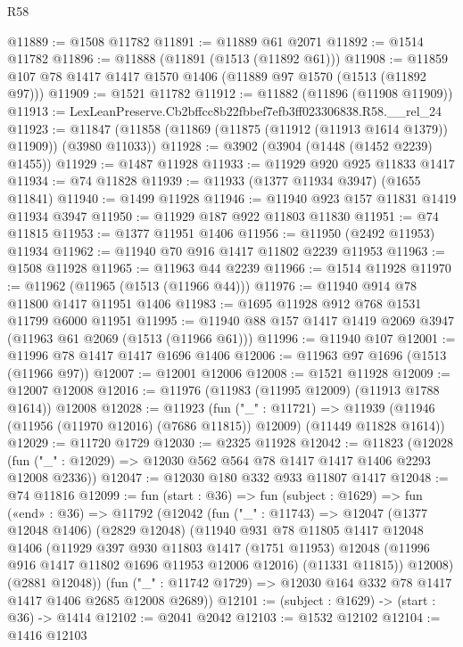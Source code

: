 \begin{lexlean}{R58}
\begin{coremodule}
{{@11889 := @1508 @11782
@11891 := @11889 @61 @2071
@11892 := @1514 @11782
@11896 := @11888 (@11891 (@1513 (@11892 @61)))
@11908 := @11859 @107 @78 @1417 @1417 @1570 @1406 (@11889 @97 @1570 (@1513 (@11892 @97)))
@11909 := @1521 @11782
@11912 := @11882 (@11896 (@11908 @11909))
@11913 := LexLeanPreserve.Cb2bffcc8b22fbbef7efb3ff023306838.R58.__rel_24
@11923 := @11847 (@11858 (@11869 (@11875 (@11912 (@11913 @1614 @1379)) @11909)) (@3980 @11033))
@11928 := @3902 (@3904 (@1448 (@1452 @2239) @1455))
@11929 := @1487 @11928
@11933 := @11929 @920 @925 @11833 @1417
@11934 := @74 @11828
@11939 := @11933 (@1377 @11934 @3947) (@1655 @11841)
@11940 := @1499 @11928
@11946 := @11940 @923 @157 @11831 @1419 @11934 @3947
@11950 := @11929 @187 @922 @11803 @11830
@11951 := @74 @11815
@11953 := @1377 @11951 @1406
@11956 := @11950 (@2492 @11953) @11934
@11962 := @11940 @70 @916 @1417 @11802 @2239 @11953
@11963 := @1508 @11928
@11965 := @11963 @44 @2239
@11966 := @1514 @11928
@11970 := @11962 (@11965 (@1513 (@11966 @44)))
@11976 := @11940 @914 @78 @11800 @1417 @11951 @1406
@11983 := @1695 @11928 @912 @768 @1531 @11799 @6000 @11951
@11995 := @11940 @88 @157 @1417 @1419 @2069 @3947 (@11963 @61 @2069 (@1513 (@11966 @61)))
@11996 := @11940 @107
@12001 := @11996 @78 @1417 @1417 @1696 @1406
@12006 := @11963 @97 @1696 (@1513 (@11966 @97))
@12007 := @12001 @12006
@12008 := @1521 @11928
@12009 := @12007 @12008
@12016 := @11976 (@11983 (@11995 @12009) (@11913 @1788 @1614)) @12008
@12028 := @11923
    (fun ("_" : @11721) =>
    @11939 (@11946 (@11956 (@11970 @12016) (@7686 @11815)) @12009) (@11449 @11828 @1614))
@12029 := @11720 @1729
@12030 := @2325 @11928
@12042 := @11823
    (@12028 (fun ("_" : @12029) => @12030 @562 @564 @78 @1417 @1417 @1406 @2293 @12008 @2336))
@12047 := @12030 @180 @332 @933 @11807 @1417
@12048 := @74 @11816
@12099 := fun (start : @36) =>
  fun (subject : @1629) =>
  fun («end» : @36) =>
  @11792
    (@12042
      (fun ("_" : @11743) =>
      @12047
        (@1377 @12048 @1406)
        (@2829 @12048)
        (@11940
          @931
          @78
          @11805
          @1417
          @12048
          @1406
          (@11929
            @397
            @930
            @11803
            @1417
            (@1751 @11953)
            @12048
            (@11996 @916 @1417 @11802 @1696 @11953 @12006 @12016)
            (@11331 @11815))
          @12008)
        (@2881 @12048))
      (fun ("_" : @11742 @1729) => @12030 @164 @332 @78 @1417 @1417 @1406 @2685 @12008 @2689))
@12101 := (subject : @1629) -> (start : @36) -> @1414
@12102 := @2041 @2042
@12103 := @1532 @12102
@12104 := @1416 @12103
}}
\end{coremodule}
\end{lexlean}
